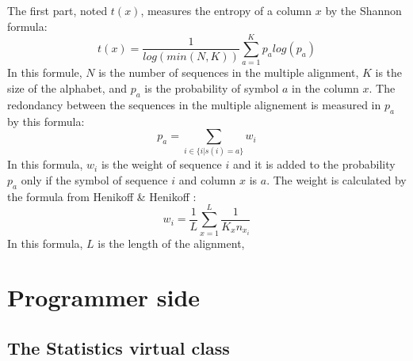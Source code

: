 \documentclass[12pt]{report}
\begin{document}
The first part, noted $t(x)$, measures the entropy of a column $x$ by the Shannon formula:
\begin{equation}
 t(x) = \frac{1}{log(min(N,K))}\sum_{a=1}^{K}p_a log(p_a)
\end{equation}
In this formule, $N$ is the number of sequences in the multiple alignment, $K$ is the size of the alphabet, and $p_a$ is the probability of symbol $a$ in the column $x$. The redondancy between the sequences in the multiple alignement is measured in $p_a$ by this formula:
\begin{equation}
	p_a = \sum_{i \in \{i|s(i) = a\}} w_i
\end{equation}
In this formula, $w_i$ is the weight of sequence $i$ and it is added to the probability $p_a$ only if the symbol of sequence $i$ and column $x$ is $a$. The weight is calculated by the formula from Henikoff \& Henikoff \cite{Henikoff-1994}:
\begin{equation}
	w_i = \frac{1}{L} \sum_{x=1}^{L}\frac{1}{K_x n_{x_i}}
\end{equation}
In this formula, $L$ is the length of the alignment, 

\newpage
\section{Programmer side}
\label{prog_sec}

\subsection{The Statistics virtual class}
\label{cla_sec}



\end{document}
